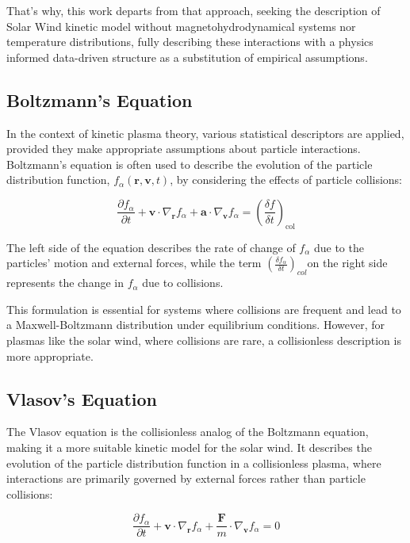\documentclass[12pt]{article}
\begin{document}
That's why, this work departs from that approach, seeking the description of Solar Wind kinetic model without magnetohydrodynamical systems nor temperature distributions, fully describing these interactions with a physics informed data-driven structure as a substitution of empirical assumptions.

\subsection{Boltzmann's Equation}

In the context of kinetic plasma theory, various statistical descriptors are applied, provided they make appropriate assumptions about particle interactions. Boltzmann's equation is often used to describe the evolution of the particle distribution function, $f_\alpha(\mathbf{r}, \mathbf{v}, t)$, by considering the effects of particle collisions:

\begin{equation}
    \frac{\partial f_\alpha}{\partial t} + \mathbf{v} \cdot \nabla_{\mathbf{r}} f_\alpha + \mathbf{a} \cdot \nabla_{\mathbf{v}} f_\alpha = \left(\frac{\delta f}{\delta t}\right)_{\mathrm{col}}
\end{equation}

The left side of the equation describes the rate of change of $f_\alpha$ due to the particles' motion and external forces, while the term $\left( \frac{\delta f_\alpha}{\delta t} \right)_{col}$on the right side represents the change in $f_\alpha$ due to collisions.

This formulation is essential for systems where collisions are frequent and lead to a Maxwell-Boltzmann distribution under equilibrium conditions. However, for plasmas like the solar wind, where collisions are rare, a collisionless description is more appropriate.

\subsection{Vlasov's Equation}

The Vlasov equation is the collisionless analog of the Boltzmann equation, making it a more suitable kinetic model for the solar wind. It describes the evolution of the particle distribution function in a collisionless plasma, where interactions are primarily governed by external forces rather than particle collisions:

\begin{equation} \frac{\partial f_\alpha}{\partial t} + \mathbf{v} \cdot \nabla_{\mathbf{r}} f_\alpha + \frac{\mathbf{F}}{m} \cdot \nabla_{\mathbf{v}} f_\alpha = 0 \end{equation}
\end{document}
